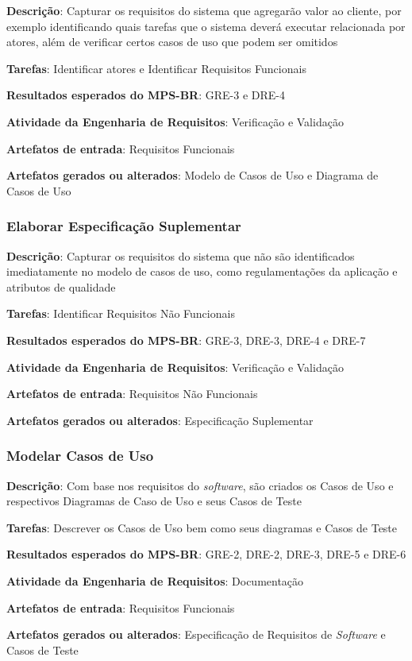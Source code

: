 \begin{description}
\item\textbf{Descrição}: Capturar os requisitos do sistema que agregarão valor ao cliente, por exemplo identificando quais tarefas que o sistema deverá executar relacionada por atores, além de verificar certos casos de uso que podem ser omitidos
\item\textbf{Tarefas}: Identificar atores e Identificar Requisitos Funcionais
\item\textbf{Resultados esperados do MPS-BR}: GRE-3 e DRE-4
\item\textbf{Atividade da Engenharia de Requisitos}: Verificação e Validação
\item\textbf{Artefatos de entrada}: Requisitos Funcionais
\item\textbf{Artefatos gerados ou alterados}: Modelo de Casos de Uso e Diagrama de Casos de Uso
\end{description}

\subsubsection{Elaborar Especificação Suplementar}

\begin{description}
\item\textbf{Descrição}: Capturar os requisitos do sistema que não são identificados imediatamente no modelo de casos de uso, como regulamentações da aplicação e atributos de qualidade
\item\textbf{Tarefas}: Identificar Requisitos Não Funcionais
\item\textbf{Resultados esperados do MPS-BR}: GRE-3, DRE-3, DRE-4 e DRE-7
\item\textbf{Atividade da Engenharia de Requisitos}: Verificação e Validação
\item\textbf{Artefatos de entrada}: Requisitos Não Funcionais
\item\textbf{Artefatos gerados ou alterados}: Especificação Suplementar
\end{description}

\subsubsection{Modelar Casos de Uso}

\begin{description}
\item\textbf{Descrição}: Com base nos requisitos do \textit{software}, são criados os Casos de Uso e respectivos Diagramas de Caso de Uso e seus Casos de Teste
\item\textbf{Tarefas}: Descrever os Casos de Uso bem como seus diagramas e Casos de Teste
\item\textbf{Resultados esperados do MPS-BR}: GRE-2, DRE-2, DRE-3, DRE-5 e DRE-6
\item\textbf{Atividade da Engenharia de Requisitos}: Documentação
\item\textbf{Artefatos de entrada}: Requisitos Funcionais
\item\textbf{Artefatos gerados ou alterados}: Especificação de Requisitos de \textit{Software} e Casos de Teste
\end{description}

